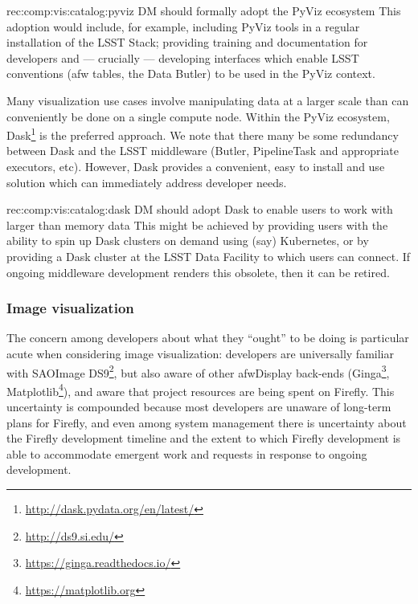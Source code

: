 \begin{recommendation}
  {rec:comp:vis:catalog:pyviz}
  {DM should formally adopt the PyViz ecosystem}
This adoption would include, for example, including PyViz tools in a regular installation of the LSST Stack; providing training and documentation for developers and --- crucially --- developing interfaces which enable LSST conventions (afw tables, the Data Butler) to be used in the PyViz context.
\end{recommendation}

Many visualization use cases involve manipulating data at a larger scale than can conveniently be done on a single compute node.
Within the PyViz ecosystem, Dask\footnote{\url{http://dask.pydata.org/en/latest/}} is the preferred approach.
We note that there many be some redundancy between Dask and the LSST middleware (Butler, PipelineTask and appropriate executors, etc).
However, Dask provides a convenient, easy to install and use solution which can immediately address developer needs.

\begin{recommendation}
  {rec:comp:vis:catalog:dask}
  {DM should adopt Dask to enable users to work with larger than memory data}
This might be achieved by providing users with the ability to spin up Dask clusters on demand using (say) Kubernetes, or by providing a Dask cluster at the LSST Data Facility to which users can connect.
If ongoing middleware development renders this obsolete, then it can be retired.
\end{recommendation}

\subsubsection{Image visualization}
\label{sec:comp:vis:image}

The concern among developers about what they ``ought'' to be doing is particular acute when considering image visualization: developers are universally familiar with SAOImage DS9\footnote{\url{http://ds9.si.edu/}}, but also aware of other afwDisplay back-ends (Ginga\footnote{\url{https://ginga.readthedocs.io/}}, Matplotlib\footnote{\url{https://matplotlib.org}}), and aware that project resources are being spent on Firefly.
This uncertainty is compounded because most developers are unaware of long-term plans for Firefly, and even among system management there is uncertainty about the Firefly development timeline and the extent to which Firefly development is able to accommodate emergent work and requests in response to ongoing development.

